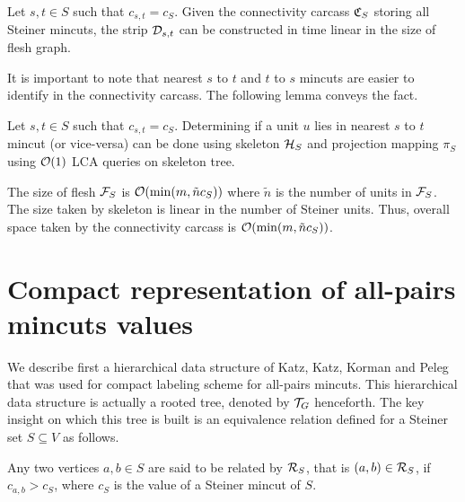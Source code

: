 \begin{lemma}
\label{lem:strip-from-carcass}
Let $s,t \in S$ such that $c_{s,t}=c_S$. Given the connectivity carcass ${\frak C}_S$ storing all Steiner mincuts, the strip ${\cal D}_{s,t}$ can be constructed in time linear in the size of flesh graph.
\end{lemma}

It is important to note that nearest $s$ to $t$ and $t$ to $s$ mincuts are easier to identify in the connectivity carcass. The following lemma conveys the fact.

\begin{lemma}
\label{lem:u-nearest-s-t-mincut}
Let $s,t \in S$ such that $c_{s,t}=c_S$. Determining if a unit $u$ lies in nearest $s$ to $t$ mincut (or vice-versa) can be done using skeleton ${\cal H}_S$ and projection mapping $\pi_S$ using ${\cal O}(1)$ LCA queries on skeleton tree.
\end{lemma}


The size of flesh ${\cal F}_S$ is ${\cal O}(\min(m,\tilde{n}c_S))$ where $\tilde{n}$ is the number of units in ${\cal F}_S$. The size taken by skeleton is linear in the number of Steiner units. Thus, overall space taken by the connectivity carcass is ${\cal O}(\min(m,\tilde{n}c_S))$.

\section{Compact representation of all-pairs mincuts values} \label{subsec:all-pairs-mincuts-values}

We describe first a hierarchical data structure of Katz, Katz, Korman and Peleg \cite{DBLP:journals/siamcomp/KatzKKP04}
that was used for compact labeling scheme for all-pairs mincuts. This hierarchical data structure is actually a rooted tree, denoted by ${\cal T}_G$ henceforth. 
The key insight on which this tree is built is an equivalence relation defined for a Steiner set $S\subseteq V$ as follows.


\begin{definition}
Any two vertices $a,b\in S$ are said to be related by ${\cal R}_S$, that is $(a,b)\in {\cal R}_S$, if
$c_{a,b}>c_S$, where $c_S$ is the value of a Steiner mincut of $S$.
\end{definition}



